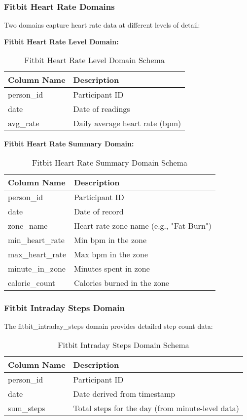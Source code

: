 \documentclass[12pt]{article}
\begin{document}
\subsubsection{Fitbit Heart Rate Domains}
Two domains capture heart rate data at different levels of detail:

\textbf{Fitbit Heart Rate Level Domain:}
\begin{table}[h]
\centering
\begin{tabular}{|l|l|}
\hline
\textbf{Column Name} & \textbf{Description} \\
\hline
person\_id & Participant ID \\
date & Date of readings \\
avg\_rate & Daily average heart rate (bpm) \\
\hline
\end{tabular}
\caption{Fitbit Heart Rate Level Domain Schema}
\end{table}

\textbf{Fitbit Heart Rate Summary Domain:}
\begin{table}[h]
\centering
\begin{tabular}{|l|l|}
\hline
\textbf{Column Name} & \textbf{Description} \\
\hline
person\_id & Participant ID \\
date & Date of record \\
zone\_name & Heart rate zone name (e.g., "Fat Burn") \\
min\_heart\_rate & Min bpm in the zone \\
max\_heart\_rate & Max bpm in the zone \\
minute\_in\_zone & Minutes spent in zone \\
calorie\_count & Calories burned in the zone \\
\hline
\end{tabular}
\caption{Fitbit Heart Rate Summary Domain Schema}
\end{table}

\subsubsection{Fitbit Intraday Steps Domain}
The fitbit\_intraday\_steps domain provides detailed step count data:
\begin{table}[h]
\centering
\begin{tabular}{|l|l|}
\hline
\textbf{Column Name} & \textbf{Description} \\
\hline
person\_id & Participant ID \\
date & Date derived from timestamp \\
sum\_steps & Total steps for the day (from minute-level data) \\
\hline
\end{tabular}
\caption{Fitbit Intraday Steps Domain Schema}
\end{table}
\end{document}
